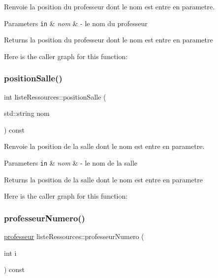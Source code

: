 Renvoie la position du professeur dont le nom est entre en parametre. 


\begin{DoxyParams}[1]{Parameters}
\mbox{\tt in}  & {\em nom} & -\/ le nom du professeur \\
\hline
\end{DoxyParams}
\begin{DoxyReturn}{Returns}
la position du professeur dont le nom est entre en parametre 
\end{DoxyReturn}
Here is the caller graph for this function\+:
\hypertarget{classliste_ressources_ad4f9c36ed425f2a3d4ca161abd6198da}{}\label{classliste_ressources_ad4f9c36ed425f2a3d4ca161abd6198da} 
\subsubsection{\texorpdfstring{position\+Salle()}{positionSalle()}}
{\footnotesize\ttfamily int liste\+Ressources\+::position\+Salle (\begin{DoxyParamCaption}\item[{std\+::string}]{nom }\end{DoxyParamCaption}) const}



Renvoie la position de la salle dont le nom est entre en parametre. 


\begin{DoxyParams}[1]{Parameters}
\mbox{\tt in}  & {\em nom} & -\/ le nom de la salle \\
\hline
\end{DoxyParams}
\begin{DoxyReturn}{Returns}
la position de la salle dont le nom est entre en parametre 
\end{DoxyReturn}
Here is the caller graph for this function\+:
\hypertarget{classliste_ressources_af6a22c9c36348e23b1bac9682e280d54}{}\label{classliste_ressources_af6a22c9c36348e23b1bac9682e280d54} 
\subsubsection{\texorpdfstring{professeur\+Numero()}{professeurNumero()}}
{\footnotesize\ttfamily \hyperlink{classprofesseur}{professeur} liste\+Ressources\+::professeur\+Numero (\begin{DoxyParamCaption}\item[{int}]{i }\end{DoxyParamCaption}) const}



